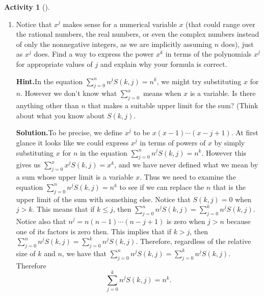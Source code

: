 \documentclass[10pt,]{book}
\theoremstyle{plain}
\theoremstyle{definition}
\newtheorem{activity}[project]{Activity}
\numberwithin{equation}{chapter}
\begin{document}
\begin{activity}[]
\begin{enumerate}[label=(\alph*)]
~\par
\item Notice that \(x^{\underline{j}}\) makes sense for a numerical variable \(x\) (that could range over the rational numbers, the real numbers, or even the complex numbers instead of only the nonnegative integers, as we are implicitly assuming \(n\) does), just as \(x^j\) does. Find a way to express the power \(x^k\) in terms of the polynomials \(x^{\underline{j}}\) for appropriate values of \(j\) and explain why your formula is correct.%
\par\medskip\noindent%
\textbf{Hint.}\quad In the equation \(\sum_{j=0}^n n^{\underline{j}}S(k,j) = n^k\), we might try substituting \(x\) for \(n\). However we don’t know what \(\sum_{j=0}^x\) means when \(x\) is a variable. Is there anything other than \(n\) that makes a suitable upper limit for the sum? (Think about what you know about \(S(k,j)\).%
\par\medskip\noindent%
\textbf{Solution.}\quad To be precise, we define \(x^{\underline{j}}\) to be \(x(x-1)\cdots (x-j+1)\). At first glance it looks like we could express \(x^{\underline{j}}\) in terms of powers of \(x\) by simply substituting \(x\) for \(n\) in the equation \(\sum_{j=0}^n n^{\underline{j}}S(k,j) = n^k\). However this gives us \(\sum_{j=0}^x x^{\underline{j}}S(k,j) = x^k\), and we have never defined what we mean by a sum whose upper limit is a variable \(x\). Thus we need to examine the equation \(\sum_{j=0}^n
n^{\underline{j}}S(k,j) = n^k\) to see if we can replace the \(n\) that is the upper limit of the sum with something else. Notice that \(S(k,j)=0\) when \(j>k\). This means that if \(k\le j\), then \(\sum_{j=0}^n
n^{\underline{j}}S(k,j)=\sum_{j=0}^k n^{\underline{j}}S(k,j)\). Notice also that \(n^{\underline{j}}= n(n-1)\cdots(n-j+1)\) is zero when \(j>n\) because one of its factors is zero then. This implies that if \(k>j\), then \(\sum_{j=0}^n
n^{\underline{j}}S(k,j)=\sum_{j=0}^k n^{\underline{j}}S(k,j)\). Therefore, regardless of the relative size of \(k\) and \(n\), we have that \(\sum_{j=0}^n n^{\underline{j}}S(k,j)=\sum_{j=0}^k
n^{\underline{j}}S(k,j)\). Therefore%
\begin{equation}
\sum_{j=0}^k n^{\underline{j}}S(k,j)=n^k. \label{changeupperlimit}
\end{equation}
%
\par

\end{enumerate}
\end{activity}
\end{document}

